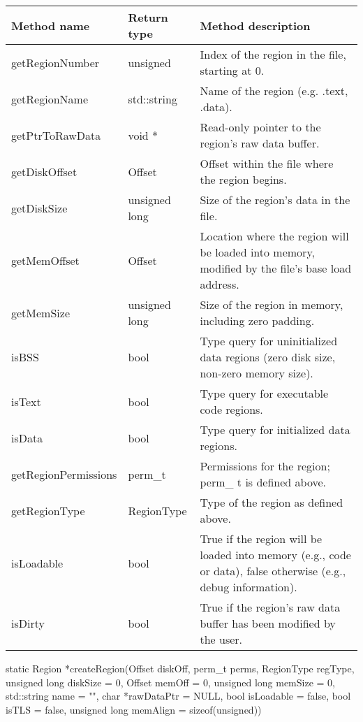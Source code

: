 \begin{tabular}{p{1.25in}p{1in}p{3.25in}}
	Method name & Return type & Method description \\
	\hline
	getRegionNumber & unsigned & Index of the region in the file, starting at 0. \\
	getRegionName & std::string & Name of the region (e.g. .text, .data). \\
	getPtrToRawData & void * & Read-only pointer to the region's raw data buffer. \\
	getDiskOffset & Offset & Offset within the file where the region begins. \\
	getDiskSize & unsigned long & Size of the region's data in the file. \\
	getMemOffset & Offset & Location where the region will be loaded into memory, modified by the file's base load address. \\
	getMemSize & unsigned long & Size of the region in memory, including zero padding. \\
	isBSS & bool & Type query for uninitialized data regions (zero disk size, non-zero memory size). \\
	isText & bool & Type query for executable code regions. \\
	isData & bool & Type query for initialized data regions. \\
	getRegionPermissions & perm\_t & Permissions for the region; perm\_ t is defined above. \\
	getRegionType & RegionType & Type of the region as defined above. \\
	isLoadable & bool & True if the region will be loaded into memory (e.g., code or data), false otherwise (e.g., debug information). \\
	isDirty & bool & True if the region's raw data buffer has been modified by the user. \\
\end{tabular}

\begin{apient}
static Region *createRegion(Offset diskOff, perm_t perms, RegionType regType,
                            unsigned long diskSize = 0, Offset memOff = 0, unsigned long memSize = 0,
                            std::string name = "", char *rawDataPtr = NULL, bool isLoadable = false,
                            bool isTLS = false, unsigned long memAlign = sizeof(unsigned))
\end{apient}

